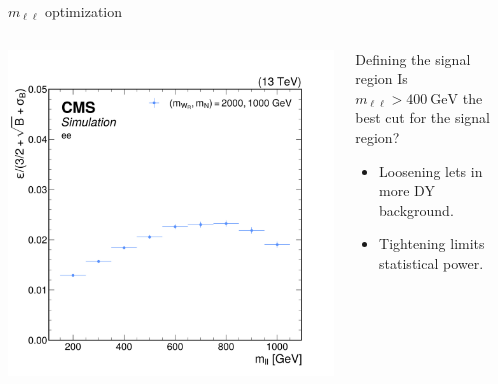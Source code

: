 \documentclass[aspectratio=169]{beamer}
\begin{document}
\begin{frame}{$m_{\ell \ell}$ optimization}
  \begin{columns}
    \begin{column}{0.50\textwidth}
      \centering
      \includegraphics[width=\textwidth]{../figures/plots/mll-optimization.png}
    \end{column}
    \begin{column}{0.50\textwidth}
        \centering
        \resizebox{\columnwidth}{!}{%
        }
      \begin{block}{Defining the signal region}
        Is $m_{\ell \ell} > 400 \mathrm{~GeV}$ the best cut for the signal region?
        \begin{itemize}
          \item Loosening lets in more DY background.
          \item Tightening limits statistical power.
        \end{itemize}
      \end{block}
    \end{column}
  \end{columns}
\end{frame}
\end{document}
